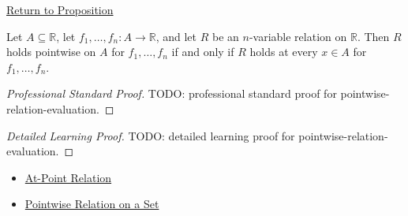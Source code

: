 \newpage
{}
\label{prf:pointwise-relation-evaluation}

\begin{remark*}[Return]
\hyperref[prop:pointwise-relation-evaluation]{Return to Proposition}
\end{remark*}

\begin{proposition*}
Let \(A\subseteq\mathbb{R}\), let \(f_1,\ldots,f_n:A\to\mathbb{R}\),
and let \(R\) be an \(n\)-variable relation on \(\mathbb{R}\).  Then
\(R\) holds pointwise on \(A\) for \(f_1,\ldots,f_n\) if and only if
\(R\) holds at every \(x\in A\) for \(f_1,\ldots,f_n\).
\end{proposition*}

\begin{proof}[Professional Standard Proof]
\LRAProofBodyStart
TODO: professional standard proof for pointwise-relation-evaluation.
\end{proof}

\begin{proof}[Detailed Learning Proof]
\LRAProofBodyStart
TODO: detailed learning proof for pointwise-relation-evaluation.
\end{proof}

\begin{remark*}
\end{remark*}

\begin{dependencies}
\begin{itemize}
  \item \hyperref[def:at-point-relation]{At-Point Relation}
  \item \hyperref[def:pointwise-relation-on-set]{Pointwise Relation on a Set}
\end{itemize}
\end{dependencies}

\clearpage
